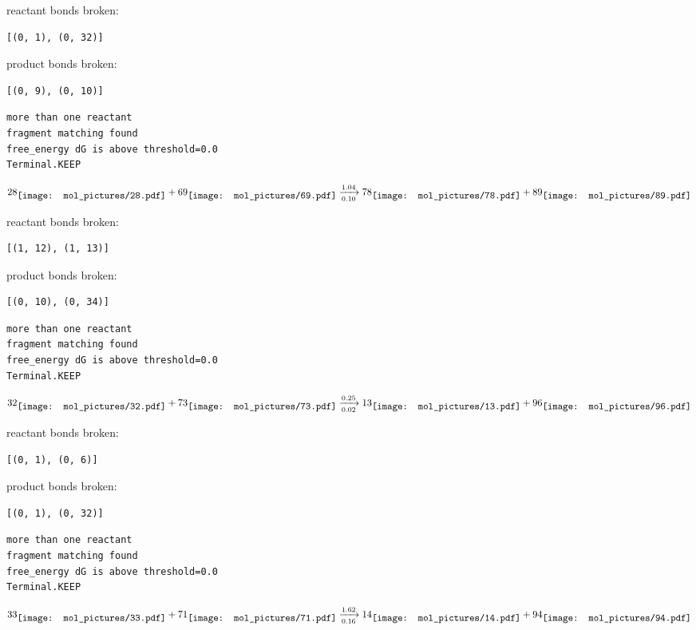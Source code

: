 \documentclass{article}
\begin{document}
reactant bonds broken:\begin{verbatim}
[(0, 1), (0, 32)]
\end{verbatim}
product bonds broken:\begin{verbatim}
[(0, 9), (0, 10)]
\end{verbatim}




\vspace{1cm}
\begin{verbatim}
more than one reactant
fragment matching found
free_energy dG is above threshold=0.0
Terminal.KEEP
\end{verbatim}
$$
28
\raisebox{-.5\height}{\texttt{[image: mol\_pictures/28.pdf]}}
+
69
\raisebox{-.5\height}{\texttt{[image: mol\_pictures/69.pdf]}}
\xrightarrow[0.10]{1.04}
78
\raisebox{-.5\height}{\texttt{[image: mol\_pictures/78.pdf]}}
+
89
\raisebox{-.5\height}{\texttt{[image: mol\_pictures/89.pdf]}}
$$


reactant bonds broken:\begin{verbatim}
[(1, 12), (1, 13)]
\end{verbatim}
product bonds broken:\begin{verbatim}
[(0, 10), (0, 34)]
\end{verbatim}




\vspace{1cm}
\begin{verbatim}
more than one reactant
fragment matching found
free_energy dG is above threshold=0.0
Terminal.KEEP
\end{verbatim}
$$
32
\raisebox{-.5\height}{\texttt{[image: mol\_pictures/32.pdf]}}
+
73
\raisebox{-.5\height}{\texttt{[image: mol\_pictures/73.pdf]}}
\xrightarrow[0.02]{0.25}
13
\raisebox{-.5\height}{\texttt{[image: mol\_pictures/13.pdf]}}
+
96
\raisebox{-.5\height}{\texttt{[image: mol\_pictures/96.pdf]}}
$$


reactant bonds broken:\begin{verbatim}
[(0, 1), (0, 6)]
\end{verbatim}
product bonds broken:\begin{verbatim}
[(0, 1), (0, 32)]
\end{verbatim}




\vspace{1cm}
\begin{verbatim}
more than one reactant
fragment matching found
free_energy dG is above threshold=0.0
Terminal.KEEP
\end{verbatim}
$$
33
\raisebox{-.5\height}{\texttt{[image: mol\_pictures/33.pdf]}}
+
71
\raisebox{-.5\height}{\texttt{[image: mol\_pictures/71.pdf]}}
\xrightarrow[0.16]{1.62}
14
\raisebox{-.5\height}{\texttt{[image: mol\_pictures/14.pdf]}}
+
94
\raisebox{-.5\height}{\texttt{[image: mol\_pictures/94.pdf]}}
$$
\end{document}
